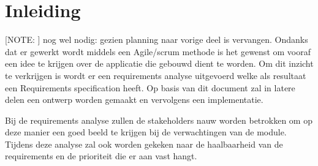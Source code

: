 
\chapter{Inleiding}\label{ch:ReqInl}
[NOTE: ] nog wel nodig: gezien planning naar vorige deel is vervangen.
Ondanks dat er gewerkt wordt middels een Agile/scrum methode is het gewenst om vooraf een idee te krijgen over de applicatie die gebouwd dient te worden. Om dit inzicht te verkrijgen is wordt er een requirements analyse uitgevoerd welke als resultaat een Requirements specification heeft. Op basis van dit document zal in latere delen een ontwerp worden gemaakt en vervolgens een implementatie.

Bij de requirements analyse zullen de stakeholders nauw worden betrokken om op deze manier
een goed beeld te krijgen bij de verwachtingen van de module. Tijdens deze analyse zal ook worden gekeken naar de haalbaarheid van de requirements en de prioriteit die er aan vast hangt.
